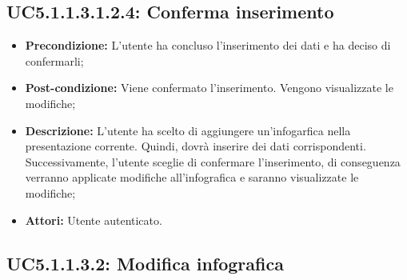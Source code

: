 \subsection{ UC5.1.1.3.1.2.4: Conferma inserimento}

\begin{itemize}
	\item \textbf{Precondizione:} L'utente ha concluso l'inserimento dei dati e ha deciso di confermarli;
	\item \textbf{Post-condizione:} Viene confermato l'inserimento. Vengono visualizzate le modifiche;
	\item \textbf{Descrizione:} L'utente ha scelto di aggiungere un'infogarfica nella presentazione corrente. Quindi, dovrà inserire dei dati corrispondenti. Successivamente, l'utente sceglie di confermare l'inserimento, di conseguenza verranno applicate modifiche all'infografica e saranno visualizzate le modifiche;
	\item \textbf{Attori:} Utente autenticato.
\end{itemize}
\subsection{ UC5.1.1.3.2: Modifica infografica}

